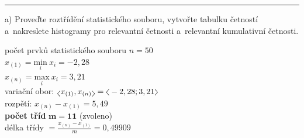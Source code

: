 \documentclass[a4paper, 11pt]{article}
\newcommand{\intlr}[1]{\scaleleftright[1ex]{<}{#1}{>}}
\begin{document}
	\vspace{1em}\noindent\rule{\textwidth}{.5pt}\vspace{1em}

	a) Proveďte roztřídění statistického souboru, vytvořte tabulku
	četností a~nakreslete histogramy pro relevantní četnosti
	a~relevantní kumulativní četnosti.
	\vspace{1em}

	počet prvků statistického souboru $ n = 50 $ \\
	$ x_{(1)} = \underset{i}{\mathrm{min}}\ x_i = -2,28 $ \\
	$ x_{(n)} = \underset{i}{\mathrm{max}}\ x_i = 3,21 $ \\
	variační obor: $ \intlr{x_{(1)}, x_{(n)}} = \intlr{-2,28; 3,21} $ \\
	rozpětí: $ x_{(n)} - x_{(1)} = 5,49 $ \\
	\textbf{počet tříd} $ \boldsymbol{m = 11} $ (zvoleno) \\
	délka třídy $ = \frac{x_{(n)} - x_{(1)}}{m} = 0,49909 $
\end{document}
